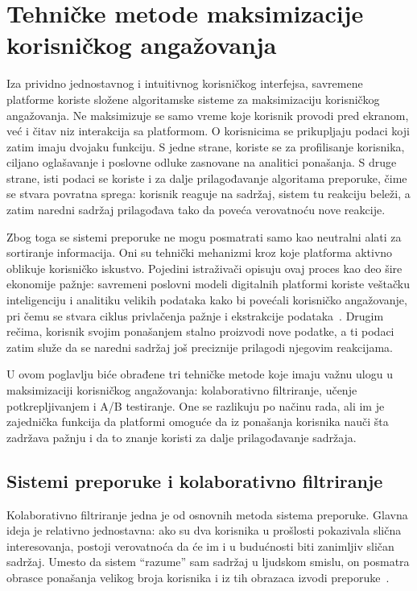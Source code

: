 \section{Tehničke metode maksimizacije korisničkog angažovanja}

Iza prividno jednostavnog i intuitivnog korisničkog interfejsa, savremene platforme koriste složene algoritamske sisteme za maksimizaciju korisničkog angažovanja. Ne maksimizuje se samo vreme koje korisnik provodi pred ekranom, već i čitav niz interakcija sa platformom. O korisnicima se prikupljaju podaci koji zatim imaju dvojaku funkciju. S jedne strane, koriste se za profilisanje korisnika, ciljano oglašavanje i poslovne odluke zasnovane na analitici ponašanja. S druge strane, isti podaci se koriste i za dalje prilagođavanje algoritama preporuke, čime se stvara povratna sprega: korisnik reaguje na sadržaj, sistem tu reakciju beleži, a zatim naredni sadržaj prilagođava tako da poveća verovatnoću nove reakcije.

Zbog toga se sistemi preporuke ne mogu posmatrati samo kao neutralni alati za sortiranje informacija. Oni su tehnički mehanizmi kroz koje platforma aktivno oblikuje korisničko iskustvo. Pojedini istraživači opisuju ovaj proces kao deo šire ekonomije pažnje: savremeni poslovni modeli digitalnih platformi koriste veštačku inteligenciju i analitiku velikih podataka kako bi povećali korisničko angažovanje, pri čemu se stvara ciklus privlačenja pažnje i ekstrakcije podataka~\cite{gonzalez2024attention}. Drugim rečima, korisnik svojim ponašanjem stalno proizvodi nove podatke, a ti podaci zatim služe da se naredni sadržaj još preciznije prilagodi njegovim reakcijama.

U ovom poglavlju biće obrađene tri tehničke metode koje imaju važnu ulogu u maksimizaciji korisničkog angažovanja: kolaborativno filtriranje, učenje potkrepljivanjem i A/B testiranje. One se razlikuju po načinu rada, ali im je zajednička funkcija da platformi omoguće da iz ponašanja korisnika nauči šta zadržava pažnju i da to znanje koristi za dalje prilagođavanje sadržaja.

\subsection{Sistemi preporuke i kolaborativno filtriranje}

Kolaborativno filtriranje jedna je od osnovnih metoda sistema preporuke. Glavna ideja je relativno jednostavna: ako su dva korisnika u prošlosti pokazivala slična interesovanja, postoji verovatnoća da će im i u budućnosti biti zanimljiv sličan sadržaj. Umesto da sistem “razume” sam sadržaj u ljudskom smislu, on posmatra obrasce ponašanja velikog broja korisnika i iz tih obrazaca izvodi preporuke~\cite{wen2008collaborative}.

